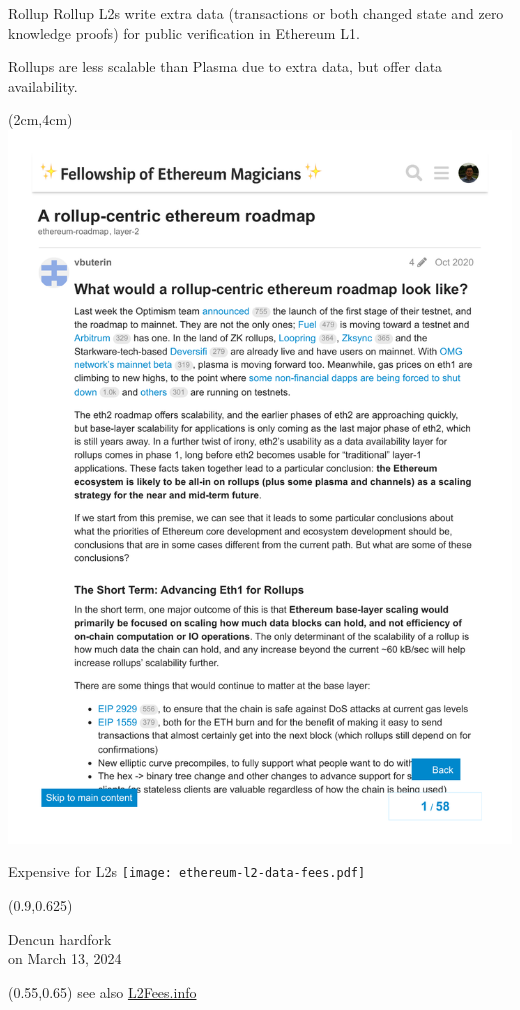 \documentclass[10pt]{beamer}
\begin{document}
\begin{frame}[fragile,t]{Rollup}
Rollup L2s write extra data (transactions or both changed
state and zero knowledge proofs) for public verification
in Ethereum L1.

Rollups are less scalable than Plasma due to extra data,
but offer data availability.

\begin{textblock*}{10cm}(2cm,4cm)
\includegraphics[trim={0 0 0 2.7cm},clip,scale=0.5]{rollup-centric-ethereum-roadmap.pdf}
\end{textblock*}
\end{frame}

\begin{frame}[fragile]{Expensive for L2s}
\texttt{[image: ethereum-l2-data-fees.pdf]}
\setlength{\TPHorizModule}{\textwidth}
\setlength{\TPVertModule}{\textwidth}
\begin{textblock}{0.2}(0.9,0.625)
{\tiny Dencun hardfork \\ on March 13, 2024 \par}
\end{textblock}
\begin{textblock}{0.2}(0.55,0.65)
{\scriptsize see also \href{https://l2fees.info/}{L2Fees.info}}
\end{textblock}
\end{frame}
\end{document}
